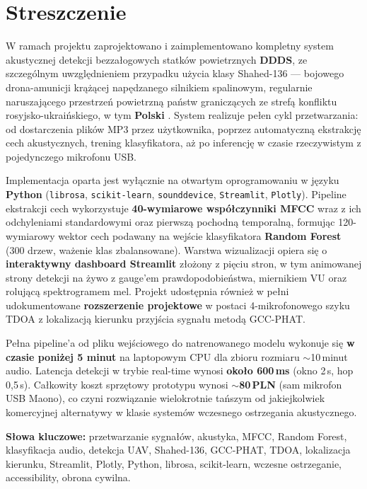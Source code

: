 \documentclass[11pt,a4paper]{article}
\begin{document}
\section*{Streszczenie}

W ramach projektu zaprojektowano i zaimplementowano kompletny system akustycznej
detekcji bezzałogowych statków powietrznych \textbf{DDDS}, ze szczególnym
uwzględnieniem przypadku użycia klasy Shahed-136 --- bojowego drona-amunicji
krążącej napędzanego silnikiem spalinowym, regularnie naruszającego przestrzeń
powietrzną państw graniczących ze strefą konfliktu rosyjsko-ukraińskiego, w tym
\textbf{Polski} \cite{shahed_airspace, who_civilian}. System realizuje pełen cykl
przetwarzania: od dostarczenia plików MP3 przez użytkownika, poprzez automatyczną
ekstrakcję cech akustycznych, trening klasyfikatora, aż po inferencję w czasie
rzeczywistym z pojedynczego mikrofonu USB.

Implementacja oparta jest wyłącznie na otwartym oprogramowaniu w języku
\textbf{Python} (\texttt{librosa}, \texttt{scikit-learn}, \texttt{sounddevice},
\texttt{Streamlit}, \texttt{Plotly}). Pipeline ekstrakcji cech wykorzystuje
\textbf{40-wymiarowe współczynniki MFCC} wraz z ich odchyleniami standardowymi
oraz pierwszą pochodną temporalną, formując 120-wymiarowy wektor cech podawany na
wejście klasyfikatora \textbf{Random Forest} (300 drzew, ważenie klas
zbalansowane). Warstwa wizualizacji opiera się o \textbf{interaktywny dashboard
Streamlit} złożony z pięciu stron, w tym animowanej strony detekcji na żywo z
gauge'em prawdopodobieństwa, miernikiem VU oraz rolującą spektrogramem mel.
Projekt udostępnia również w pełni udokumentowane \textbf{rozszerzenie projektowe}
w postaci 4-mikrofonowego szyku TDOA z lokalizacją kierunku przyjścia sygnału
metodą GCC-PHAT.

Pełna pipeline'a od pliku wejściowego do natrenowanego modelu wykonuje się
\textbf{w czasie poniżej 5 minut} na laptopowym CPU dla zbioru rozmiaru
$\sim$10\,minut audio. Latencja detekcji w trybie real-time wynosi
\textbf{około 600\,ms} (okno 2\,s, hop 0{,}5\,s). Całkowity koszt sprzętowy
prototypu wynosi \textbf{$\sim$80\,PLN} (sam mikrofon USB Maono), co czyni
rozwiązanie wielokrotnie tańszym od jakiejkolwiek komercyjnej alternatywy w
klasie systemów wczesnego ostrzegania akustycznego.

\textbf{Słowa kluczowe:}
przetwarzanie sygnałów, akustyka, MFCC, Random Forest, klasyfikacja audio,
detekcja UAV, Shahed-136, GCC-PHAT, TDOA, lokalizacja kierunku, Streamlit,
Plotly, Python, librosa, scikit-learn, wczesne ostrzeganie, accessibility,
obrona cywilna.
\end{document}
